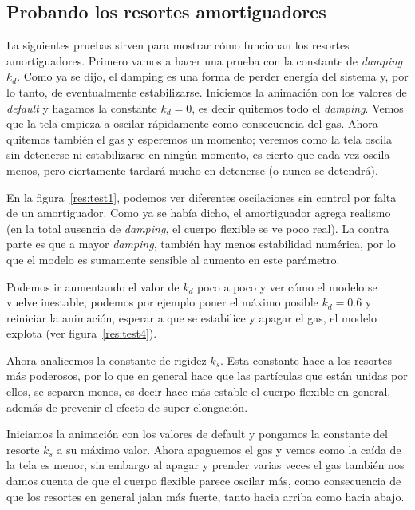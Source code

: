 \subsection{Probando los resortes amortiguadores}
La siguientes pruebas sirven para mostrar cómo funcionan los resortes amortiguadores. Primero vamos a hacer una prueba con la constante de \emph{\foreignlanguage{english}{damping}} $k_d$. Como ya se dijo, el damping es una forma de perder energía del sistema y, por lo tanto, de eventualmente estabilizarse. Iniciemos la animación con los valores de \emph{\foreignlanguage{english}{default}} y hagamos la constante $k_d=0$, es decir quitemos todo el \emph{\foreignlanguage{english}{damping}}. Vemos que la tela empieza a oscilar rápidamente como consecuencia del gas. Ahora quitemos también el gas y esperemos un momento; veremos como la tela oscila sin detenerse ni estabilizarse en ningún momento, es cierto que cada vez oscila menos, pero ciertamente tardará mucho en detenerse (o nunca se detendrá).

En la figura~\ref{res:test1}, podemos ver diferentes oscilaciones sin control por falta de un amortiguador. Como ya se había dicho, el amortiguador agrega realismo (en la total ausencia de \emph{\foreignlanguage{english}{damping}}, el cuerpo flexible se ve poco real). La contra parte es que a mayor \emph{\foreignlanguage{english}{damping}}, también hay menos estabilidad numérica, por lo que el modelo es sumamente sensible al aumento en este parámetro.

Podemos ir aumentando el valor de $k_d$ poco a poco y ver cómo el modelo se vuelve inestable, podemos por ejemplo poner el máximo posible $k_d=$0.6 y reiniciar la animación, esperar a que se estabilice y apagar el gas, el modelo explota (ver figura~\ref{res:test4}).

Ahora analicemos la constante de rigidez $k_s$. Esta constante hace a los resortes más poderosos, por lo que en general hace que las partículas que están unidas por ellos, se separen menos, es decir hace más estable el cuerpo flexible en general, además de prevenir el efecto de super elongación.

Iniciamos la animación con los valores de default y pongamos la constante del resorte $k_s$ a su máximo valor. Ahora apaguemos el gas y vemos como la caída de la tela es menor, sin embargo al apagar y prender varias veces el gas también nos damos cuenta de que el cuerpo flexible parece oscilar más, como consecuencia de que los resortes en general jalan más fuerte, tanto hacia arriba como hacia abajo.

